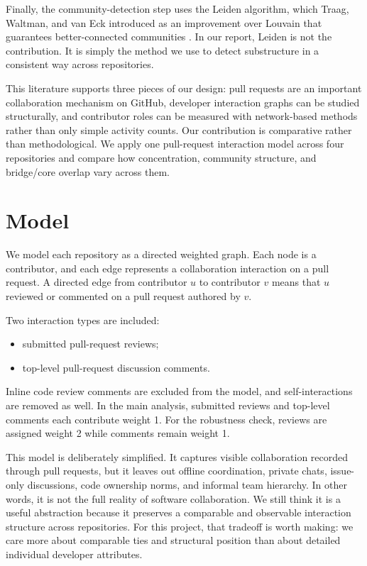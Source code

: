 \documentclass[11pt]{article}
\begin{document}
Finally, the community-detection step uses the Leiden algorithm, which Traag, Waltman, and van Eck introduced as an improvement over Louvain that guarantees better-connected communities \cite{traag2019}. In our report, Leiden is not the contribution. It is simply the method we use to detect substructure in a consistent way across repositories.

This literature supports three pieces of our design: pull requests are an important collaboration mechanism on GitHub, developer interaction graphs can be studied structurally, and contributor roles can be measured with network-based methods rather than only simple activity counts. Our contribution is comparative rather than methodological. We apply one pull-request interaction model across four repositories and compare how concentration, community structure, and bridge/core overlap vary across them.

\section{Model}
We model each repository as a directed weighted graph. Each node is a contributor, and each edge represents a collaboration interaction on a pull request. A directed edge from contributor $u$ to contributor $v$ means that $u$ reviewed or commented on a pull request authored by $v$.

Two interaction types are included:
\begin{itemize}[leftmargin=1.5em]
    \item submitted pull-request reviews;
    \item top-level pull-request discussion comments.
\end{itemize}

Inline code review comments are excluded from the model, and self-interactions are removed as well. In the main analysis, submitted reviews and top-level comments each contribute weight 1. For the robustness check, reviews are assigned weight 2 while comments remain weight 1.

This model is deliberately simplified. It captures visible collaboration recorded through pull requests, but it leaves out offline coordination, private chats, issue-only discussions, code ownership norms, and informal team hierarchy. In other words, it is not the full reality of software collaboration. We still think it is a useful abstraction because it preserves a comparable and observable interaction structure across repositories. For this project, that tradeoff is worth making: we care more about comparable ties and structural position than about detailed individual developer attributes.
\end{document}
